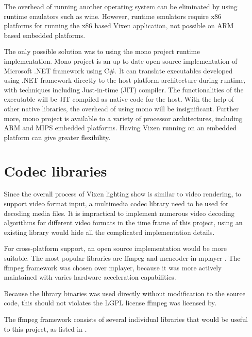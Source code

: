 The overhead of running another operating system can be eliminated by using runtime emulators such as wine. However, runtime emulators require x86 platforms for running the x86 based Vixen application, not possible on ARM based embedded platforms.

The only possible solution was to using the mono project runtime implementation. Mono project is an up-to-date open source implementation of Microsoft .NET framework using C\#. It can translate executables developed using .NET framework directly to the host platform architecture during runtime, with techniques including Just-in-time (JIT) compiler. The functionalities of the executable will be JIT compiled as native code for the host. With the help of other native libraries, the overhead of using mono will be insignificant. Further more, mono project is available to a variety of processor architectures, including ARM and MIPS embedded platforms. Having Vixen running on an embedded platform can give greater flexibility.

\section{Codec libraries}

Since the overall process of Vixen lighting show is similar to video rendering, to support video format input, a multimedia codec library need to be used for decoding media files. It is impractical to implement numerous video decoding algorithms for different video formats in the time frame of this project, using an existing library would hide all the complicated implementation details.

For cross-platform support, an open source implementation would be more suitable. The most popular libraries are ffmpeg \cite{ffmpeg} and mencoder in mplayer \cite{mplayer}. The ffmpeg framework was chosen over mplayer, because it was more actively maintained with varies hardware acceleration capabilities.

Because the library binaries was used directly without modification to the source code, this should not violates the LGPL license ffmpeg was licensed by.

The ffmpeg framework consists of several individual libraries that would be useful to this project, as listed in .

